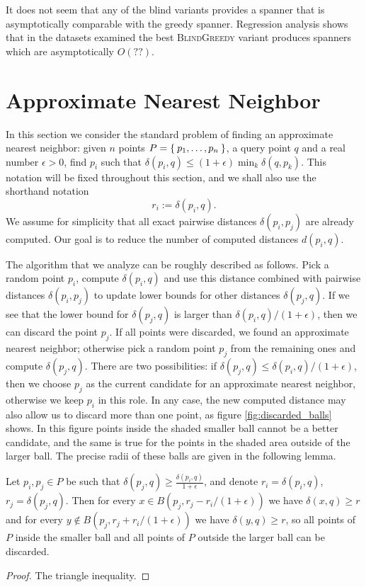 \documentclass[a4paper,USenglish]{socg-lipics-v2018}
\newcommand{\eps}{\epsilon}
\newcommand{\dist}{\delta}
\begin{document}
It does not seem that any of the blind variants provides a spanner that is asymptotically comparable
with the greedy spanner. Regression analysis shows that in the datasets examined the best \textsc{BlindGreedy}
variant produces spanners which are asymptotically $O(??)$.

\section{Approximate Nearest Neighbor}

In this section we consider the standard problem of finding an approximate nearest neighbor: given
$n$ points $P = \Set{p_1, \dots, p_n}$, a query point $q$ and a real number $\eps > 0$,
find $p_i$ such that $\dist(p_i, q) \leq (1 + \eps) \min_{k} \dist(q, p_k)$. This notation will be fixed throughout this 
section, and we shall also use the shorthand notation
\[
    r_i := \dist(p_i, q).
\]
We assume for simplicity
that all exact pairwise distances $\dist(p_i, p_j)$ are already computed. Our goal is to reduce the number
of computed distances $d(p_i, q)$.


The algorithm that we analyze can be roughly described as follows. Pick a random point $p_i$,
compute $\dist(p_i, q)$ and use this distance combined with pairwise distances $\dist(p_i, p_j)$
to update lower bounds for other distances $\dist(p_j, q)$.
If we see that the lower bound for $\dist(p_j, q)$ is larger than $\dist(p_i, q) / (1+\eps)$, then 
we can discard the point $p_j$. If all points were discarded, we found an approximate nearest neighbor;
otherwise pick a random point $p_j$ from the remaining ones and compute $\dist(p_j, q)$.
There are two possibilities: if $\dist(p_j, q) \leq \dist(p_i, q) / (1+\eps)$,
then we choose $p_j$ as the current candidate for an approximate nearest neighbor,
otherwise we keep $p_i$ in this role. In any case, the new computed distance
may also allow us to discard more than one point, as figure \ref{fig:discarded_balls} shows. In
this figure points inside the shaded smaller ball cannot be a better candidate,
and the same is true for the points in the shaded area outside of the larger ball.
The precise radii of these balls are given in the following lemma.



\begin{lemma}
    Let $p_i, p_j \in P$ be such that $\dist(p_j, q) \geq \frac{\dist(p_i, q)}{1 + \eps}$,
    and denote $r_i = \dist(p_i, q)$, $r_j = \dist(p_j, q)$.
    Then for every $x \in B(p_j, r_j - r_i / (1+\eps))$ we have $\dist(x, q) \geq r$
    and for every $y \notin B(p_j, r_j + r_i / (1+ \eps))$ we have $\dist(y, q) \geq r$,
    so all points of $P$ inside the smaller ball and all points of $P$ outside the larger ball
    can be discarded.
\end{lemma}
\begin{proof}
    The triangle inequality.
\end{proof}
\end{document}
